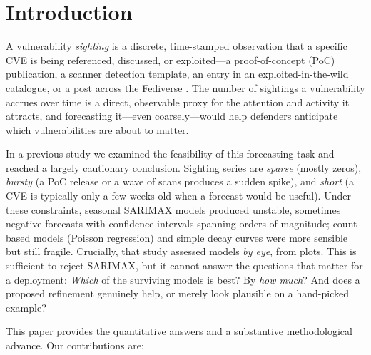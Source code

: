 \documentclass[]{article}
\begin{document}
\section{Introduction}
A vulnerability \emph{sighting} is a discrete, time-stamped observation that a
specific CVE is being referenced, discussed, or exploited---a proof-of-concept
(PoC) publication, a scanner detection template, an entry in an exploited-in-the-wild
catalogue, or a post across the Fediverse \cite{bonhomme2025scoring}. The number
of sightings a vulnerability accrues over time is a direct, observable proxy for
the attention and activity it attracts, and forecasting it---even coarsely---would
help defenders anticipate which vulnerabilities are about to matter.

In a previous study \cite{bonhomme2026modeling} we examined the feasibility of
this forecasting task and reached a largely cautionary conclusion. Sighting series
are \emph{sparse} (mostly zeros), \emph{bursty} (a PoC release or a wave of scans
produces a sudden spike), and \emph{short} (a CVE is typically only a few weeks
old when a forecast would be useful). Under these constraints, seasonal SARIMAX
models produced unstable, sometimes negative forecasts with confidence intervals
spanning orders of magnitude; count-based models (Poisson regression) and simple
decay curves were more sensible but still fragile. Crucially, that study assessed
models \emph{by eye}, from plots. This is sufficient to reject SARIMAX, but it
cannot answer the questions that matter for a deployment: \emph{Which} of the
surviving models is best? By \emph{how much}? And does a proposed refinement
genuinely help, or merely look plausible on a hand-picked example?

This paper provides the quantitative answers and a substantive methodological
advance. Our contributions are:
\end{document}
